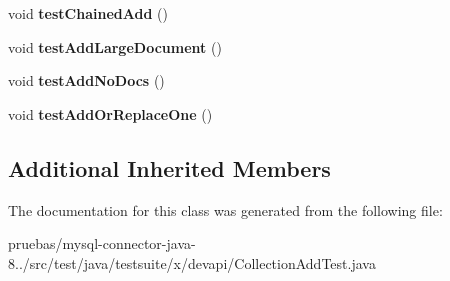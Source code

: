\begin{DoxyCompactItemize}
void {\bfseries test\+Chained\+Add} ()
\item 
\mbox{\label{classtestsuite_1_1x_1_1devapi_1_1_collection_add_test_afb18571ef5e4519aead82658bdb740d2}} 
void {\bfseries test\+Add\+Large\+Document} ()
\item 
\mbox{\label{classtestsuite_1_1x_1_1devapi_1_1_collection_add_test_a73fd3448e76d09a9b254a5e699b9cd6d}} 
void {\bfseries test\+Add\+No\+Docs} ()
\item 
\mbox{\label{classtestsuite_1_1x_1_1devapi_1_1_collection_add_test_ae06c318a2df37207be739448fc47634e}} 
void {\bfseries test\+Add\+Or\+Replace\+One} ()
\end{DoxyCompactItemize}
\subsection*{Additional Inherited Members}


The documentation for this class was generated from the following file\+:\begin{DoxyCompactItemize}
\item 
pruebas/mysql-\/connector-\/java-\/8../src/test/java/testsuite/x/devapi/Collection\+Add\+Test.\+java\end{DoxyCompactItemize}
